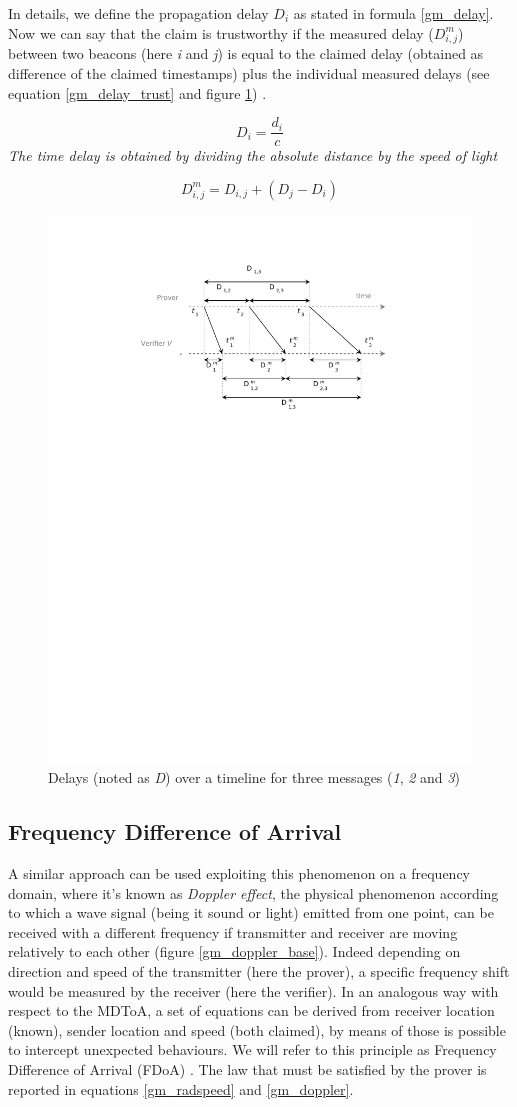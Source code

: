\documentclass[conference]{IEEEtran}
\begin{document}
In details, we define the propagation delay \(D_i\) as stated in formula \eqref{gm_delay}. Now we can say that the claim is trustworthy if the measured delay (\(D_{i,j}^m\)) between two beacons (here \textit{i} and \textit{j}) is equal to the claimed delay (obtained as difference of the claimed timestamps) plus the individual measured delays (see equation \eqref{gm_delay_trust} and figure \ref{gm_delay_pic}) \cite{schaefer15}.

\begin{equation}
    D_i = \frac{d_i}{c}
    \label{gm_delay}
\end{equation}
\emph{The time delay is obtained by dividing the absolute distance by the speed of light}

\begin{equation}
    D_{i,j}^m = D_{i,j} + (D_j - D_i)
    \label{gm_delay_trust}
\end{equation}

\begin{figure}
    \includegraphics[width=.47\textwidth,trim={46mm 177mm 40mm 20mm},clip]{gm_delay_pic}
    \caption{Delays (noted as \textit{D}) over a timeline for three messages (\textit{1}, \textit{2} and \textit{3})}
    \label{gm_delay_pic}
\end{figure}

\subsection{Frequency Difference of Arrival}

A similar approach can be used exploiting this phenomenon on a frequency domain, where it's known as \textit{Doppler effect}, the physical phenomenon according to which a wave signal (being it sound or light) emitted from one point, can be received with a different frequency if transmitter and receiver are moving relatively to each other (figure \ref{gm_doppler_base}). Indeed depending on direction and speed of the transmitter (here the prover), a specific frequency shift would be measured by the receiver (here the verifier). In an analogous way with respect to the MDToA, a set of equations can be derived from receiver location (known), sender location and speed (both claimed), by means of those is possible to intercept unexpected behaviours. We will refer to this principle as Frequency Difference of Arrival (FDoA) \cite{schaefer16} \cite{ghose15}. The law that must be satisfied by the prover is reported in equations \eqref{gm_radspeed} and \eqref{gm_doppler}.
\end{document}

